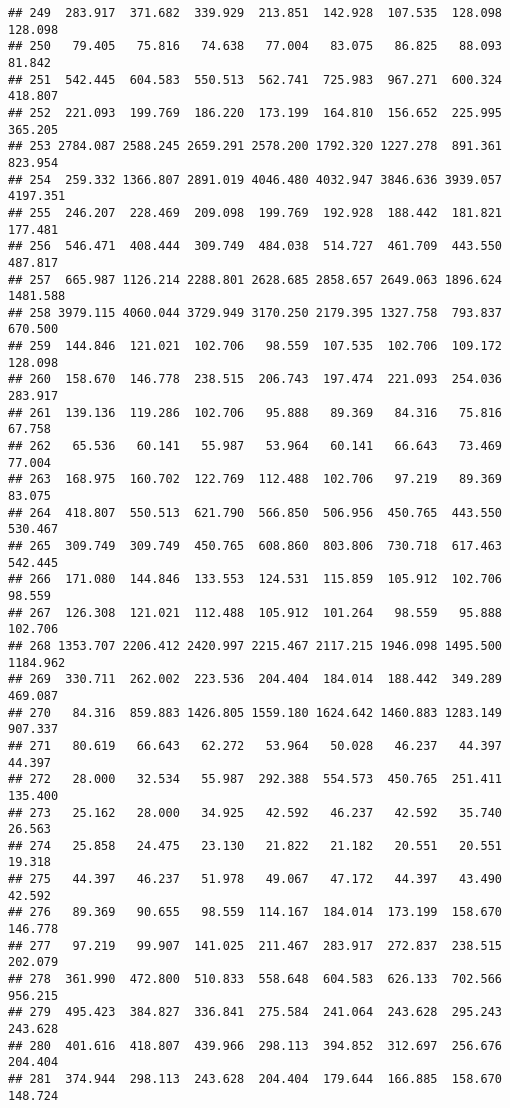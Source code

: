 \documentclass[
]{article}
\begin{document}
\begin{verbatim}
## 249  283.917  371.682  339.929  213.851  142.928  107.535  128.098  128.098
## 250   79.405   75.816   74.638   77.004   83.075   86.825   88.093   81.842
## 251  542.445  604.583  550.513  562.741  725.983  967.271  600.324  418.807
## 252  221.093  199.769  186.220  173.199  164.810  156.652  225.995  365.205
## 253 2784.087 2588.245 2659.291 2578.200 1792.320 1227.278  891.361  823.954
## 254  259.332 1366.807 2891.019 4046.480 4032.947 3846.636 3939.057 4197.351
## 255  246.207  228.469  209.098  199.769  192.928  188.442  181.821  177.481
## 256  546.471  408.444  309.749  484.038  514.727  461.709  443.550  487.817
## 257  665.987 1126.214 2288.801 2628.685 2858.657 2649.063 1896.624 1481.588
## 258 3979.115 4060.044 3729.949 3170.250 2179.395 1327.758  793.837  670.500
## 259  144.846  121.021  102.706   98.559  107.535  102.706  109.172  128.098
## 260  158.670  146.778  238.515  206.743  197.474  221.093  254.036  283.917
## 261  139.136  119.286  102.706   95.888   89.369   84.316   75.816   67.758
## 262   65.536   60.141   55.987   53.964   60.141   66.643   73.469   77.004
## 263  168.975  160.702  122.769  112.488  102.706   97.219   89.369   83.075
## 264  418.807  550.513  621.790  566.850  506.956  450.765  443.550  530.467
## 265  309.749  309.749  450.765  608.860  803.806  730.718  617.463  542.445
## 266  171.080  144.846  133.553  124.531  115.859  105.912  102.706   98.559
## 267  126.308  121.021  112.488  105.912  101.264   98.559   95.888  102.706
## 268 1353.707 2206.412 2420.997 2215.467 2117.215 1946.098 1495.500 1184.962
## 269  330.711  262.002  223.536  204.404  184.014  188.442  349.289  469.087
## 270   84.316  859.883 1426.805 1559.180 1624.642 1460.883 1283.149  907.337
## 271   80.619   66.643   62.272   53.964   50.028   46.237   44.397   44.397
## 272   28.000   32.534   55.987  292.388  554.573  450.765  251.411  135.400
## 273   25.162   28.000   34.925   42.592   46.237   42.592   35.740   26.563
## 274   25.858   24.475   23.130   21.822   21.182   20.551   20.551   19.318
## 275   44.397   46.237   51.978   49.067   47.172   44.397   43.490   42.592
## 276   89.369   90.655   98.559  114.167  184.014  173.199  158.670  146.778
## 277   97.219   99.907  141.025  211.467  283.917  272.837  238.515  202.079
## 278  361.990  472.800  510.833  558.648  604.583  626.133  702.566  956.215
## 279  495.423  384.827  336.841  275.584  241.064  243.628  295.243  243.628
## 280  401.616  418.807  439.966  298.113  394.852  312.697  256.676  204.404
## 281  374.944  298.113  243.628  204.404  179.644  166.885  158.670  148.724

\end{verbatim}
\end{document}
